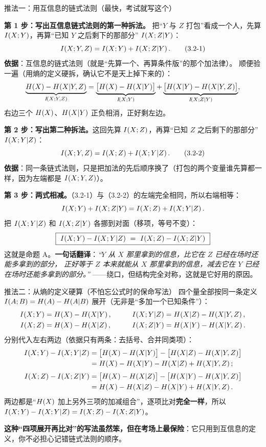 \documentclass[11pt,a4paper]{ctexart}
\begin{document}
\begin{calc}{推法一：用互信息的链式法则（最快，考试就写这个）}

\textbf{第 1 步：写出互信息链式法则的第一种拆法。}
把“$Y$ 与 $Z$ 打包”看成一个人，先算 $I\!\left(X;Y\right)$，再算“已知 $Y$ 之后剩下的那部分” $I\!\left(X;Z|Y\right)$：
\begin{equation}
I\!\left(X;Y,Z\right)=I\!\left(X;Y\right)+I\!\left(X;Z|Y\right). \tag{3.2-1}
\end{equation}
\textbf{依据}：互信息的链式法则（就是“先算一个、再算条件版”的那个加法律）。
顺便验一遍（用熵的定义硬拆，确认它不是天上掉下来的）：
\[
\underbrace{\Hx{X}-\Hx{X|Y,Z}}_{\I{X;Y,Z}}
=\underbrace{\bigl[\Hx{X}-\Hx{X|Y}\bigr]}_{\I{X;Y}}
+\underbrace{\bigl[\Hx{X|Y}-\Hx{X|Y,Z}\bigr]}_{\I{X;Z|Y}},
\]
右边三个 $H\!\left(X\right)$、$H\!\left(X|Y\right)$ 正负相消，正好剩左边。\checkmark

\textbf{第 2 步：写出第二种拆法。}这回先算 $I\!\left(X;Z\right)$，再算“已知 $Z$ 之后剩下的那部分” $I\!\left(X;Y|Z\right)$：
\begin{equation}
I\!\left(X;Y,Z\right)=I\!\left(X;Z\right)+I\!\left(X;Y|Z\right). \tag{3.2-2}
\end{equation}
\textbf{依据}：同一条链式法则，只是把加法的先后顺序换了（打包的两个变量谁先算都一样，因为左端都是 $I\!\left(X;Y,Z\right)$）。

\textbf{第 3 步：两式相减。}（3.2-1）与（3.2-2）的左端完全相同，所以右端相等：
\[
I\!\left(X;Y\right)+I\!\left(X;Z|Y\right)=I\!\left(X;Z\right)+I\!\left(X;Y|Z\right).
\]
把 $I\!\left(X;Y|Z\right)$ 和 $I\!\left(X;Z|Y\right)$ 各挪到对面（移项，等号不变）：
\[
\boxed{\ \I{X;Y}-\I{X;Y|Z}\ =\ \I{X;Z}-\I{X;Z|Y}\ }
\]
这就是命题 A。\textbf{一句话翻译}：\emph{“$Y$ 从 $X$ 那里拿到的信息，比它在 $Z$ 已经在场时还能多拿到的部分，
正好等于 $Z$ 本来就能从 $X$ 那里拿到的信息，减去它在 $Y$ 已经在场时还能多拿到的部分。”}
——绕口，但结构完全对称，这就是它好用的原因。
\end{calc}

\begin{calc}{推法二：从熵的定义硬算（不怕忘公式时的保命写法）}
四个量全部按同一条定义 $I\!\left(A;B\right)=H\!\left(A\right)-H\!\left(A|B\right)$ 展开（无非是“多加一个已知条件”）：
\begin{align*}
\I{X;Y}&=\Hx{X}-\Hx{X|Y}, &\qquad \I{X;Y|Z}&=\Hx{X|Z}-\Hx{X|Y,Z},\\
\I{X;Z}&=\Hx{X}-\Hx{X|Z}, &\qquad \I{X;Z|Y}&=\Hx{X|Y}-\Hx{X|Y,Z}.
\end{align*}
分别代入左右两边（依据只有两条：去括号、合并同类项）：
\begin{align*}
\I{X;Y}-\I{X;Y|Z}
&=\bigl[\Hx{X}-\Hx{X|Y}\bigr]-\bigl[\Hx{X|Z}-\Hx{X|Y,Z}\bigr]\\
&=\Hx{X}-\Hx{X|Y}-\Hx{X|Z}+\Hx{X|Y,Z};\\[2pt]
\I{X;Z}-\I{X;Z|Y}
&=\bigl[\Hx{X}-\Hx{X|Z}\bigr]-\bigl[\Hx{X|Y}-\Hx{X|Y,Z}\bigr]\\
&=\Hx{X}-\Hx{X|Z}-\Hx{X|Y}+\Hx{X|Y,Z}.
\end{align*}
两边都是“$H\!\left(X\right)$ 加上另外三项的加减组合”，逐项比对\textbf{完全一样}，所以
$I\!\left(X;Y\right)-I\!\left(X;Y|Z\right)=I\!\left(X;Z\right)-I\!\left(X;Z|Y\right)$。\checkmark

\textbf{这种“四项展开再比对”的写法虽然笨，但在考场上最保险}：它只用到互信息的定义，你不必担心记错链式法则的顺序。
\end{calc}
\end{document}
